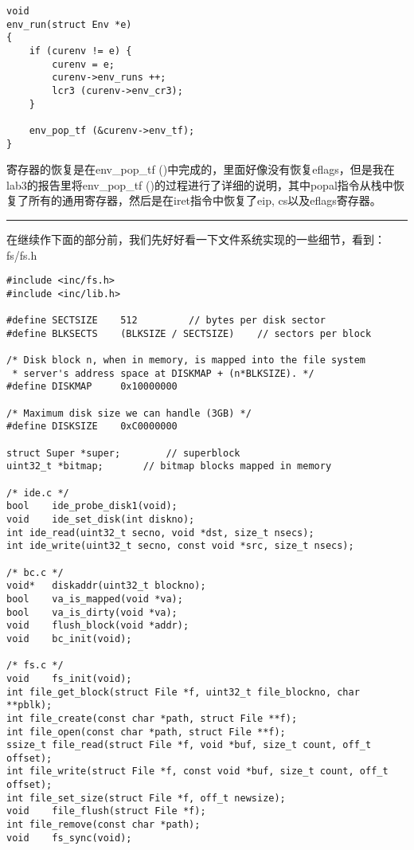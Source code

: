 \documentclass{article}
\newcommand{\funcname}[1]{{\ttfamily \small #1}}
\begin{document}
\begin{CJK*}{UTF8}{gkai}
\begin{lstlisting}[style=ccode, title={\scriptsize \ttfamily \bfseries kern/env.c}]
void
env_run(struct Env *e)
{
    if (curenv != e) {
        curenv = e;
        curenv->env_runs ++;
        lcr3 (curenv->env_cr3);
    }

    env_pop_tf (&curenv->env_tf);
}
\end{lstlisting}

寄存器的恢复是在\funcname{env\_pop\_tf ()}中完成的，里面好像没有恢复eflags，但是我在lab3的报告里将\funcname{env\_pop\_tf ()}的过程进行了详细的说明，其中popal指令从栈中恢复了所有的通用寄存器，然后是在iret指令中恢复了eip, cs以及eflags寄存器。

\vspace{2em}

\hrule

\vspace{2em}

在继续作下面的部分前，我们先好好看一下文件系统实现的一些细节，看到：fs/fs.h

\begin{lstlisting}[style=ccode, title={\scriptsize \ttfamily \bfseries fs/fs.h}]
#include <inc/fs.h>
#include <inc/lib.h>

#define SECTSIZE	512			// bytes per disk sector
#define BLKSECTS	(BLKSIZE / SECTSIZE)	// sectors per block

/* Disk block n, when in memory, is mapped into the file system
 * server's address space at DISKMAP + (n*BLKSIZE). */
#define DISKMAP		0x10000000

/* Maximum disk size we can handle (3GB) */
#define DISKSIZE	0xC0000000

struct Super *super;		// superblock
uint32_t *bitmap;		// bitmap blocks mapped in memory

/* ide.c */
bool	ide_probe_disk1(void);
void	ide_set_disk(int diskno);
int	ide_read(uint32_t secno, void *dst, size_t nsecs);
int	ide_write(uint32_t secno, const void *src, size_t nsecs);

/* bc.c */
void*	diskaddr(uint32_t blockno);
bool	va_is_mapped(void *va);
bool	va_is_dirty(void *va);
void	flush_block(void *addr);
void	bc_init(void);

/* fs.c */
void	fs_init(void);
int	file_get_block(struct File *f, uint32_t file_blockno, char **pblk);
int	file_create(const char *path, struct File **f);
int	file_open(const char *path, struct File **f);
ssize_t	file_read(struct File *f, void *buf, size_t count, off_t offset);
int	file_write(struct File *f, const void *buf, size_t count, off_t offset);
int	file_set_size(struct File *f, off_t newsize);
void	file_flush(struct File *f);
int	file_remove(const char *path);
void	fs_sync(void);


\end{lstlisting}
\end{CJK*}
\end{document}
